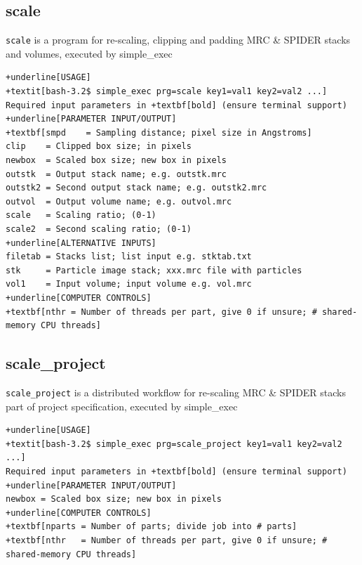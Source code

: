 \documentclass[a4paper,11pt]{article}
\newcommand{\prgname}[1]{\textcolor{NavyBlue}{\texttt{#1}}}
\begin{document}
\subsection{scale}
\label{scale}
\prgname{scale} is a program for re-scaling, clipping and padding MRC \& SPIDER stacks and volumes, executed by simple\_exec
\begin{Verbatim}[commandchars=+\[\],fontsize=\small,breaklines=true]
+underline[USAGE]
+textit[bash-3.2$ simple_exec prg=scale key1=val1 key2=val2 ...]
Required input parameters in +textbf[bold] (ensure terminal support)
+underline[PARAMETER INPUT/OUTPUT]
+textbf[smpd    = Sampling distance; pixel size in Angstroms]
clip    = Clipped box size; in pixels
newbox  = Scaled box size; new box in pixels
outstk  = Output stack name; e.g. outstk.mrc
outstk2 = Second output stack name; e.g. outstk2.mrc
outvol  = Output volume name; e.g. outvol.mrc
scale   = Scaling ratio; (0-1)
scale2  = Second scaling ratio; (0-1)
+underline[ALTERNATIVE INPUTS]
filetab = Stacks list; list input e.g. stktab.txt
stk     = Particle image stack; xxx.mrc file with particles
vol1    = Input volume; input volume e.g. vol.mrc
+underline[COMPUTER CONTROLS]
+textbf[nthr = Number of threads per part, give 0 if unsure; # shared-memory CPU threads]
\end{Verbatim}

\subsection{scale\_project}
\label{scale_project}
\prgname{scale\_project} is a distributed workflow for re-scaling MRC \& SPIDER stacks part of project specification, executed by simple\_exec
\begin{Verbatim}[commandchars=+\[\],fontsize=\small,breaklines=true]
+underline[USAGE]
+textit[bash-3.2$ simple_exec prg=scale_project key1=val1 key2=val2 ...]
Required input parameters in +textbf[bold] (ensure terminal support)
+underline[PARAMETER INPUT/OUTPUT]
newbox = Scaled box size; new box in pixels
+underline[COMPUTER CONTROLS]
+textbf[nparts = Number of parts; divide job into # parts]
+textbf[nthr   = Number of threads per part, give 0 if unsure; # shared-memory CPU threads]
\end{Verbatim}
\end{document}
